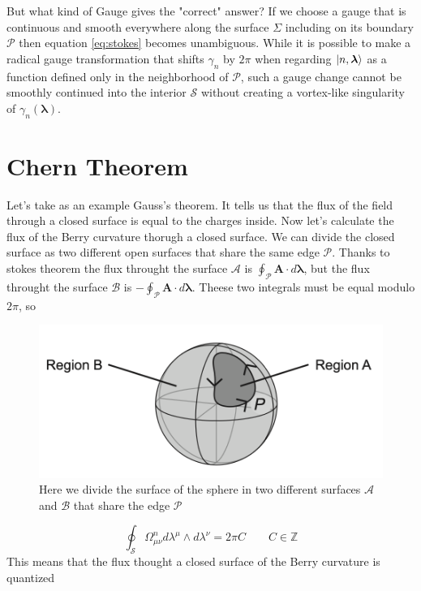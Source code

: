 \documentclass[11pt,a4paper]{report}
\theoremstyle{definition}
\theoremstyle{plain}
\theoremstyle{plain}
\begin{document}
		But what kind of Gauge gives the "correct" answer? If we choose a gauge that is continuous and smooth
		everywhere along the surface $\Sigma$ including on its boundary $\mathcal P$ then equation \ref{eq:stokes} becomes unambiguous.\newline
		While it is possible to make a radical gauge transformation that shifts $\gamma_n$ by $2\pi$ when regarding $\ket{n,\boldsymbol \lambda}$ as a function defined only in the neighborhood of $\mathcal P$, such a gauge change cannot be smoothly continued into the interior $\mathcal S$ without creating a vortex-like singularity of $\gamma_n(\boldsymbol \lambda)$.


	\section{Chern Theorem}
			
			Let's take as an example Gauss's theorem. It tells us that the flux of the field through a closed surface is equal to the charges inside. \newline
			Now let's calculate the flux of the Berry curvature thorugh a closed surface. We can divide the closed surface as two different open surfaces that share the same edge $\mathcal P$.\newline
			Thanks to stokes theorem the flux throught the surface $\mathcal A$ is $\oint_\mathcal{P} \mathbf A \cdot d\boldsymbol \lambda$, but the flux throught the surface $\mathcal B$ is $-\oint_\mathcal{P} \mathbf A \cdot d\boldsymbol \lambda$.\newline
			Theese two integrals must be equal modulo $2\pi$, so
			\begin{figure}
				\centering
				\includegraphics[width=0.85\linewidth]{../website/images/berry/chern_theorem.png}
				\caption{Here we divide the surface of the sphere in two different surfaces $\mathcal A$ and $\mathcal B$ that share the edge $\mathcal P$}
				\label{fig:forward_pass}
			\end{figure}
			\begin{equation}
				\label{eq:chern}
				\oint_\mathcal{S} \Omega_{\mu\nu}^n d\lambda^\mu \wedge d\lambda^\nu =2\pi C \quad\quad C\in \mathbb Z
			\end{equation}
			This means that the flux thought a closed surface of the Berry curvature is quantized
			
\end{document}
